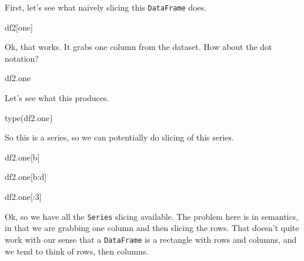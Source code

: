 \documentclass[
  letterpaper,
]{scrbook}
\newenvironment{Shaded}{\begin{snugshade}}{\end{snugshade}}
\newcommand{\BuiltInTok}[1]{#1}
\newcommand{\DecValTok}[1]{\textcolor[rgb]{0.00,0.00,0.81}{#1}}
\newcommand{\NormalTok}[1]{#1}
\newcommand{\StringTok}[1]{\textcolor[rgb]{0.31,0.60,0.02}{#1}}
\begin{document}
First, let's see what naively slicing this \texttt{DataFrame} does.

\begin{Shaded}
\begin{Highlighting}[]
\NormalTok{df2[}\StringTok{\textquotesingle{}one\textquotesingle{}}\NormalTok{]}
\end{Highlighting}
\end{Shaded}

Ok, that works. It grabs one column from the dataset. How about the dot notation?

\begin{Shaded}
\begin{Highlighting}[]
\NormalTok{df2.one}
\end{Highlighting}
\end{Shaded}

Let's see what this produces.

\begin{Shaded}
\begin{Highlighting}[]
\BuiltInTok{type}\NormalTok{(df2.one)}
\end{Highlighting}
\end{Shaded}

So this is a series, so we can potentially do slicing of this series.

\begin{Shaded}
\begin{Highlighting}[]
\NormalTok{df2.one[}\StringTok{\textquotesingle{}b\textquotesingle{}}\NormalTok{]}
\end{Highlighting}
\end{Shaded}

\begin{Shaded}
\begin{Highlighting}[]
\NormalTok{df2.one[}\StringTok{\textquotesingle{}b\textquotesingle{}}\NormalTok{:}\StringTok{\textquotesingle{}d\textquotesingle{}}\NormalTok{]}
\end{Highlighting}
\end{Shaded}

\begin{Shaded}
\begin{Highlighting}[]
\NormalTok{df2.one[:}\DecValTok{3}\NormalTok{]}
\end{Highlighting}
\end{Shaded}

Ok, so we have all the \texttt{Series} slicing available. The problem here is in semantics, in that we are grabbing one column and then slicing the rows. That doesn't quite work with our sense that a \texttt{DataFrame} is a rectangle with rows and columns, and we tend to think of rows, then columns.
\end{document}
